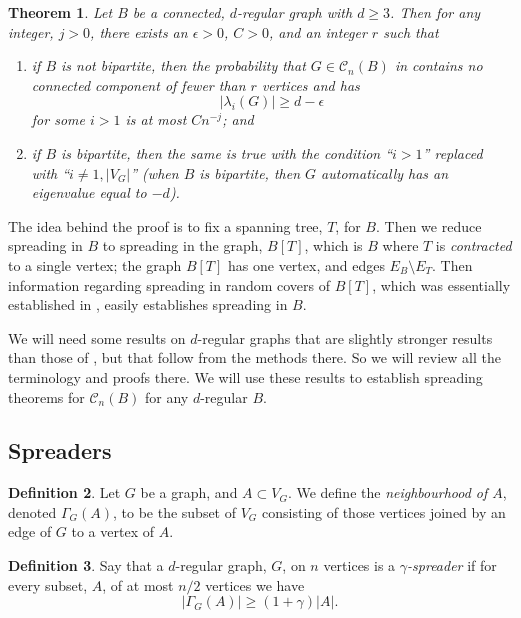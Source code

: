 \documentclass{memo-l}
\theoremstyle{plain}
\newtheorem{theorem}{Theorem}[section]
\theoremstyle{definition}
\newtheorem{definition}[theorem]{Definition}
\numberwithin{section}{chapter}
\numberwithin{equation}{chapter}
\theoremstyle{plain}
\theoremstyle{definition}
\newcommand\cC{\mathcal{C}}
\begin{document}
\begin{theorem}\label{th:tangle_spreading}
Let $B$ be a connected,
$d$-regular graph with $d\ge 3$.
Then for any integer, $j>0$,
there exists an $\epsilon>0$, $C>0$, and an integer $r$ such that
\begin{enumerate}
\item if $B$ is not bipartite, then
the probability that
$G\in\cC_n(B)$ in contains no connected component of fewer than
$r$ vertices and has
$$
|\lambda_i(G)|\ge d-\epsilon
$$
for some $i>1$ is at most $Cn^{-j}$; and
\item if $B$ is bipartite, then the same is true with the condition
``\;$i>1$'' replaced with
``\;$i\ne 1,|V_G|$'' (when $B$ is bipartite, then $G$ automatically has
an eigenvalue equal to $-d$).
\end{enumerate}
\end{theorem}

The idea behind the proof is to fix a spanning tree, $T$, for $B$.
Then we reduce spreading in $B$ to spreading in the graph, $B[T]$, which
is $B$ where $T$ is {\em contracted} to a single vertex; the graph
$B[T]$ has one vertex, and edges $E_B\setminus E_T$.
Then information regarding spreading in random covers of
$B[T]$, which was essentially established
in \cite{friedman_alon}, easily establishes spreading in $B$.

We will need some results on $d$-regular graphs that 
are slightly stronger results than those of 
\cite{friedman_random_graphs}, but that follow from the methods there.
So we will review all the terminology
and proofs there.  We will use these results to establish spreading
theorems for $\cC_n(B)$ for any $d$-regular $B$.

\subsection{Spreaders}
\label{sb:spreaders}

\begin{definition}
Let $G$ be a graph, and $A\subset V_G$.  We define the
{\em neighbourhood of $A$}, denoted $\Gamma_G(A)$, to be the subset
of $V_G$ consisting of those vertices joined by
an edge of $G$ to a vertex of $A$.
\end{definition}

\begin{definition}
Say that a $d$-regular graph, $G$, on $n$ vertices is a {\em $\gamma$-spreader}
if for every subset,
$A$, of at most $n/2$ vertices we have
$$
|\Gamma_G(A)|\ge (1+\gamma)|A|.
$$
\end{definition}
\end{document}
